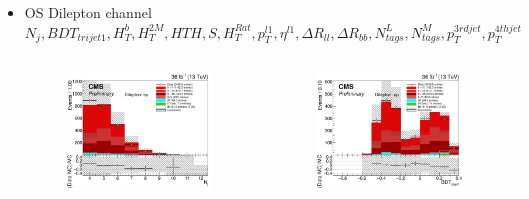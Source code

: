 \documentclass{beamer}
\begin{document}
\begin{frame}
\begin{itemize}
\begin{columns}
	\end{columns}
	\item {\small OS Dilepton channel}
	{\tiny $N_{j}, BDT_{trijet1}, H_{T}^{b}, H_{T}^{2M}, HTH, S, H_{T}^{Rat}, p_{T}^{l1}, \eta^{l1}, \Delta R_{ll}, \Delta R_{bb}, N_{tags}^{L}, N_{tags}^{M}, p_{T}^{3rd jet}, p_{T}^{4th jet}$}
	\vspace{-15pt}
	\begin{columns}
		 \begin{figure} \includegraphics[scale=0.15]{njets_di.pdf} \end{figure}
		 \begin{figure} \includegraphics[scale=0.15]{topness_di.pdf} \end{figure}

\end{columns}
\end{itemize}
\end{frame}
\end{document}

